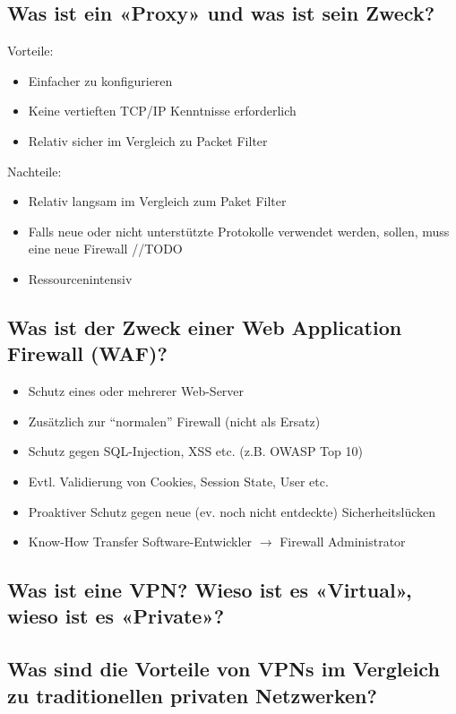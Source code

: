 \subsection*{Was ist ein «Proxy» und was ist sein Zweck?}
Vorteile:
\begin{itemize}
    \item Einfacher zu konfigurieren
    \item Keine vertieften TCP/IP Kenntnisse erforderlich
    \item Relativ sicher im Vergleich zu Packet Filter
\end{itemize}
Nachteile:
\begin{itemize}
    \item Relativ langsam im Vergleich zum Paket Filter
    \item Falls neue oder nicht unterstützte Protokolle verwendet werden, sollen, muss eine neue Firewall //TODO
    \item Ressourcenintensiv
\end{itemize}

\subsection*{Was ist der Zweck einer Web Application Firewall (WAF)?}
\begin{itemize}
    \item Schutz eines oder mehrerer Web-Server
    \item Zusätzlich zur "`normalen"' Firewall (nicht als Ersatz)
    \item Schutz gegen SQL-Injection, XSS etc. (z.B. OWASP Top 10)
    \item Evtl. Validierung von Cookies, Session State, User etc.
    \item Proaktiver Schutz gegen neue (ev. noch nicht entdeckte) Sicherheitslücken
    \item Know-How Transfer Software-Entwickler $\rightarrow$ Firewall Administrator
\end{itemize}

\subsection*{Was ist eine VPN? Wieso ist es «Virtual», wieso ist es «Private»?}
\subsection*{Was sind die Vorteile von VPNs im Vergleich zu traditionellen privaten Netzwerken?}
